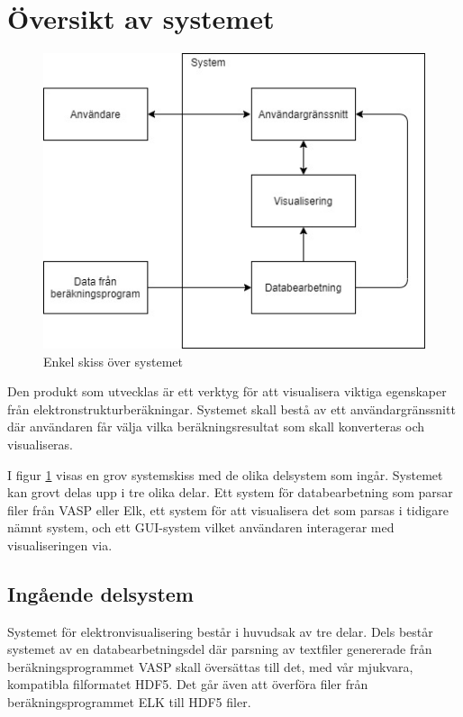 \documentclass[10pt,oneside,swedish]{article}
\begin{document}
\newpage
\section{Översikt av systemet}\label{uxf6versikt-av-systemet}

\begin{figure}[H]
\centering
\includegraphics[width=1.00000\textwidth]{Images/system_overview.png}
\caption{Enkel skiss över systemet}
\label{fig:oversikt}
\end{figure}

Den produkt som utvecklas är ett verktyg för att visualisera viktiga
egenskaper från elektronstrukturberäkningar. Systemet skall bestå av ett
användargränssnitt där användaren får välja vilka beräkningsresultat som
skall konverteras och visualiseras.

I figur \ref{fig:oversikt} visas en grov systemskiss med de olika delsystem
som ingår. Systemet kan grovt delas upp i tre olika delar. Ett system
för databearbetning som parsar filer från VASP eller Elk, ett system för att
visualisera det som parsas i tidigare nämnt system, och ett GUI-system
vilket användaren interagerar med visualiseringen via.

\subsection{Ingående delsystem}\label{inguxe5ende-delsystem}

Systemet för elektronvisualisering består i huvudsak av tre delar. Dels
består systemet av en databearbetningsdel där parsning av textfiler
genererade från beräkningsprogrammet VASP skall översättas till det, med
vår mjukvara, kompatibla filformatet HDF5. Det går även att överföra filer från beräkningsprogrammet ELK till HDF5 filer.
\end{document}
